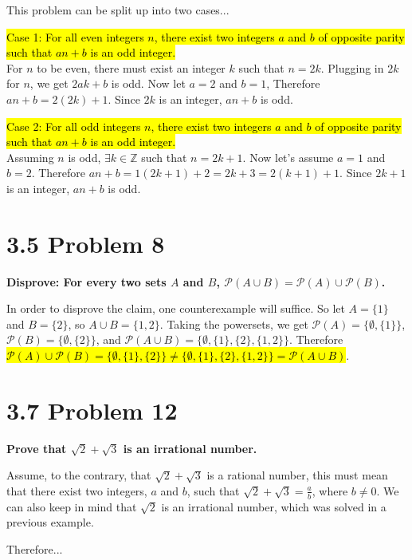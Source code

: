 \documentclass[10pt]{article}
\def \n {\par \vspace{\baselineskip}}
\begin{document}
\n
This problem can be split up into two cases... 
\n\hl{Case 1: For all even integers $n$, there exist two integers $a$ and $b$ of opposite parity such that $an + b$ is an odd integer.} \\
For $n$ to be even, there must exist an integer $k$ such that $n = 2k$. 
Plugging in $2k$ for $n$, we get $2ak + b$ is odd.  Now let $a = 2$ and $b = 1$, 
Therefore $an + b = 2(2k) + 1$.  Since $2k$ is an integer, $an + b$ is odd.



\n\hl{Case 2: For all odd integers $n$, there exist two integers $a$ and $b$ of opposite parity such that $an + b$ is an odd integer.} \\
Assuming $n$ is odd, $\exists k \in \mathbb{Z}$ such that $n = 2k + 1$.  Now let's assume $a = 1$ and $b = 2$.
Therefore $an + b = 1(2k + 1) + 2 = 2k + 3 = 2(k + 1) + 1$.  Since $2k + 1$ is an integer, $an + b$ is odd.


\section{3.5 Problem 8}
\textbf{Disprove: For every two sets $A$ and $B$, $\mathcal{P}(A \cup B) = \mathcal{P}(A) \cup \mathcal{P}(B)$.}

\n
In order to disprove the claim, one counterexample will suffice.  So let $A = \{1\}$ and $B = \{2\}$, so $A \cup B = \{1,2\}$. 
Taking the powersets, we get $\mathcal{P}(A) = \big\{\emptyset, \{1\}\big\}$, $\mathcal{P}(B) = \big\{\emptyset, \{2\}\big\}$, and 
$\mathcal{P}(A \cup B) = \big\{\emptyset, \{1\}, \{2\}, \{1,2\}\big\}$.  
Therefore \hl{$\mathcal{P}(A) \cup \mathcal{P}(B) = \big\{\emptyset,\{1\},\{2\}\big\} \not= \big\{\emptyset, \{1\}, \{2\}, \{1,2\}\big\}
= \mathcal{P}(A \cup B)$}.


\section{3.7 Problem 12}
\textbf{Prove that $\sqrt{2} + \sqrt{3}$ is an irrational number.}

\n
Assume, to the contrary, that $\sqrt{2} + \sqrt{3}$ is a rational number, this must mean that there exist two integers, $a$ and $b$,
such that $\sqrt{2} + \sqrt{3} = \frac{a}{b}$, where $b \not= 0$.  We can also keep in mind that $\sqrt{2}$ is an irrational number, which
was solved in a previous example.

Therefore... 
\end{document}
